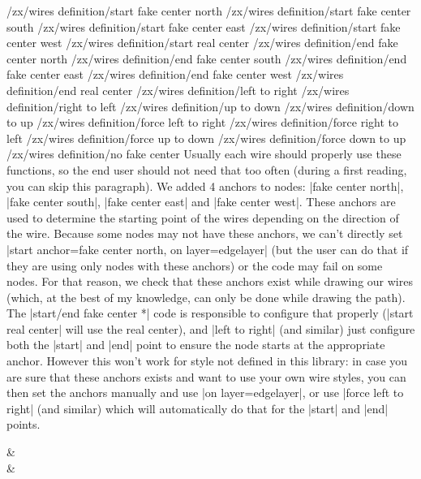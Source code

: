 \documentclass[a4paper,doc2]{ltxdoc} %
\begin{document}
{\begin{pgfmanualentry}
  \makeatletter
  \def\extrakeytext{style, }
  \extractkey/zx/wires definition/start fake center north\@nil%
  \extractkey/zx/wires definition/start fake center south\@nil%
  \extractkey/zx/wires definition/start fake center east\@nil%
  \extractkey/zx/wires definition/start fake center west\@nil%
  \extractkey/zx/wires definition/start real center\@nil
  \extractkey/zx/wires definition/end fake center north\@nil%
  \extractkey/zx/wires definition/end fake center south\@nil%
  \extractkey/zx/wires definition/end fake center east\@nil%
  \extractkey/zx/wires definition/end fake center west\@nil%
  \extractkey/zx/wires definition/end real center\@nil
  \extractkey/zx/wires definition/left to right\@nil%
  \extractkey/zx/wires definition/right to left\@nil%
  \extractkey/zx/wires definition/up to down\@nil%
  \extractkey/zx/wires definition/down to up\@nil%
  \extractkey/zx/wires definition/force left to right\@nil%
  \extractkey/zx/wires definition/force right to left\@nil%
  \extractkey/zx/wires definition/force up to down\@nil%
  \extractkey/zx/wires definition/force down to up\@nil%
  \extractkey/zx/wires definition/no fake center\@nil%
  \makeatother
  \pgfmanualbody
  Usually each wire should properly use these functions, so the end user should not need that too often (during a first reading, you can skip this paragraph). We added 4 anchors to nodes: |fake center north|, |fake center south|, |fake center east| and |fake center west|. These anchors are used to determine the starting point of the wires depending on the direction of the wire. Because some nodes may not have these anchors, we can't directly set |start anchor=fake center north, on layer=edgelayer| (but the user can do that if they are using only nodes with these anchors) or the code may fail on some nodes. For that reason, we check that these anchors exist while drawing our wires (which, at the best of my knowledge, can only be done while drawing the path). The |start/end fake center *| code is responsible to configure that properly (|start real center| will use the real center), and |left to right| (and similar) just configure both the |start| and |end| point to ensure the node starts at the appropriate anchor. However this won't work for style not defined in this library: in case you are sure that these anchors exists and want to use your own wire styles, you can then set the anchors manually and use |on layer=edgelayer|, or use |force left to right| (and similar) which will automatically do that for the |start| and |end| points.
\begin{codeexample}[]
\begin{ZX}
  \zxX{\alpha+\beta}  & \zxZ{\alpha+\beta}\\
  \zxX{\alpha+\beta} \ar[r,o'] & \zxZ{\alpha+\beta}
\end{ZX}
\end{codeexample}
\end{pgfmanualentry}

}
\end{document}
